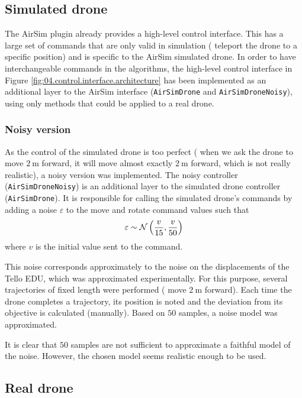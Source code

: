 \subsection{Simulated drone}\label{sec:04.simulated.drone}

The AirSim plugin already provides a high-level control interface. This has a large set of commands that are only valid in simulation (\eg{} teleport the drone to a specific position) and is specific to the AirSim simulated drone. In order to have interchangeable commands in the algorithms, the high-level control interface in Figure \ref{fig:04.control.interface.architecture} has been implemented as an additional layer to the AirSim interface (\texttt{AirSimDrone} and \texttt{AirSimDroneNoisy}), using only methods that could be applied to a real drone.

\subsubsection{Noisy version}

As the control of the simulated drone is too perfect (\eg{} when we ask the drone to move $\SI{2}{\meter}$ forward, it will move almost exactly $\SI{2}{\meter}$ forward, which is not really realistic), a noisy version was implemented. The noisy controller (\texttt{AirSimDroneNoisy}) is an additional layer to the simulated drone controller (\texttt{AirSimDrone}). It is responsible for calling the simulated drone's commands by adding a noise $\varepsilon$ to the move and rotate command values such that
\begin{equation}
    \varepsilon \sim \mathcal{N}\left(\frac{v}{15}, \frac{v}{50}\right)
\end{equation}
where $v$ is the initial value sent to the command.

This noise corresponds approximately to the noise on the displacements of the Tello EDU, which was approximated experimentally. For this purpose, several trajectories of fixed length were performed (\eg{} move $\SI{2}{\meter}$ forward). Each time the drone completes a trajectory, its position is noted and the deviation from its objective is calculated (manually). Based on $\num{50}$ samples, a noise model was approximated.

It is clear that $\num{50}$ samples are not sufficient to approximate a faithful model of the noise. However, the chosen model seems realistic enough to be used.

\subsection{Real drone}

